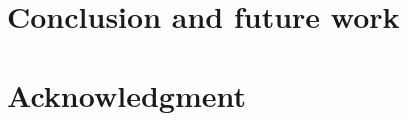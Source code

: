 \documentclass[chi_draft]{sigchi}
\begin{document}
%
%
%
%
%
%


\section{Conclusion and future work}






\section*{Acknowledgment}
\end{document}
